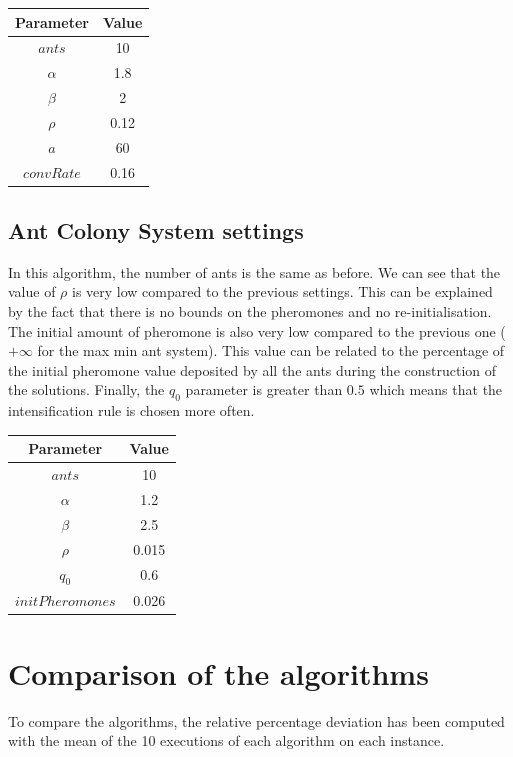 \documentclass{article}
\begin{document}
\begin{tabular}{c|c}
    Parameter & Value \\ \hline
    $ants$    & 10    \\
    $\alpha$  & 1.8   \\
    $\beta$   & 2     \\
    $\rho$    & 0.12  \\
    $a$       & 60    \\
    $convRate$& 0.16  \\
\end{tabular}

\subsection{Ant Colony System settings}

In this algorithm, the number of ants is the same as before.
We can see that the value of $\rho$ is very low compared to the previous settings.
This can be explained by the fact that there is no bounds on the pheromones and no re-initialisation.
The initial amount of pheromone is also very low compared to the previous one ($+\infty$ for the max min ant system).
This value can be related to the percentage of the initial pheromone value deposited by all the ants during the construction of the solutions.
Finally, the $q_0$ parameter is greater than $0.5$ which means that the intensification rule is chosen more often. \newline

\begin{tabular}{c|c}
    Parameter        & Value \\ \hline
    $ants$           & 10    \\
    $\alpha$         & 1.2   \\
    $\beta$          & 2.5   \\
    $\rho$           & 0.015 \\
    $q_0$            & 0.6   \\
    $initPheromones$ & 0.026 \\
\end{tabular}

\section{Comparison of the algorithms}

To compare the algorithms, the relative percentage deviation has been computed with the mean of the 10 executions of each algorithm on each instance.
\end{document}
